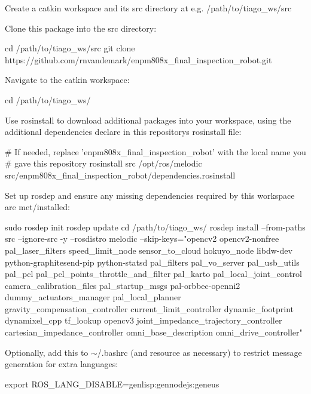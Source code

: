 \begin{DoxyItemize}
\item Create a catkin workspace and its src directory at e.\+g. /path/to/tiago\+\_\+ws/src
\item Clone this package into the src directory\+: 
\begin{DoxyCode}
cd /path/to/tiago\_ws/src
git clone https://github.com/rnvandemark/enpm808x\_final\_inspection\_robot.git
\end{DoxyCode}

\item Navigate to the catkin workspace\+: 
\begin{DoxyCode}
cd /path/to/tiago\_ws/
\end{DoxyCode}

\item Use rosinstall to download additional packages into your workspace, using the additional dependencies declare in this repository\textquotesingle{}s rosinstall file\+: 
\begin{DoxyCode}
# If needed, replace 'enpm808x\_final\_inspection\_robot' with the local name you
# gave this repository
rosinstall src /opt/ros/melodic src/enpm808x\_final\_inspection\_robot/dependencies.rosinstall
\end{DoxyCode}

\item Set up rosdep and ensure any missing dependencies required by this workspace are met/installed\+: 
\begin{DoxyCode}
sudo rosdep init
rosdep update
cd /path/to/tiago\_ws/
rosdep install --from-paths src --ignore-src -y --rosdistro melodic --skip-keys="opencv2 opencv2-nonfree
       pal\_laser\_filters speed\_limit\_node sensor\_to\_cloud hokuyo\_node libdw-dev python-graphitesend-pip python-statsd
       pal\_filters pal\_vo\_server pal\_usb\_utils pal\_pcl pal\_pcl\_points\_throttle\_and\_filter pal\_karto
       pal\_local\_joint\_control camera\_calibration\_files pal\_startup\_msgs pal-orbbec-openni2 dummy\_actuators\_manager
       pal\_local\_planner gravity\_compensation\_controller current\_limit\_controller dynamic\_footprint dynamixel\_cpp tf\_lookup
       opencv3 joint\_impedance\_trajectory\_controller cartesian\_impedance\_controller omni\_base\_description
       omni\_drive\_controller"
\end{DoxyCode}

\item Optionally, add this to $\sim$/.bashrc (and resource as necessary) to restrict message generation for extra languages\+: 
\begin{DoxyCode}
export ROS\_LANG\_DISABLE=genlisp:gennodejs:geneus
\end{DoxyCode}

\end{DoxyItemize}


